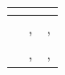\begin{tabular}{|c|c|c|}
    \hline
     & \textbf{} & \textbf{}  \\
     \hline
     \textbf{} & , & , \\
     \hline
     \textbf{} & , & , \\
     \hline 
\end{tabular}
